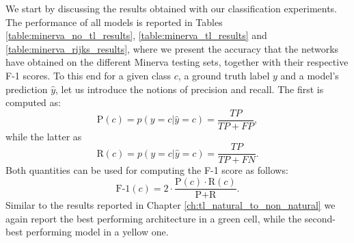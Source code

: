 We start by discussing the results obtained with our classification experiments. The performance of all models is reported in Tables \ref{table:minerva_no_tl_results}, \ref{table:minerva_tl_results} and \ref{table:minerva_rijks_results}, where we present the accuracy that the networks have obtained on the different Minerva testing sets, together with their respective F-1 scores. To this end for a given class $c$, a ground truth label $y$ and a model's prediction $\hat{y}$, let us introduce the notions of precision and recall. The first is computed as:
\begin{equation}
	\text{P}(c)=p(y=c|\hat{y}=c)=\frac{TP}{TP+FP},
\end{equation}
while the latter as
\begin{equation}
	\text{R}(c)=p(y=c|\hat{y}=c)=\frac{TP}{TP+FN}.
\end{equation}
Both quantities can be used for computing the F-1 score as follows:
\begin{equation}
	\text{F-1}(c)=2 \cdot \frac{\text{P}(c)\cdot\text{R}(c)}{\text{P}+\text{R}}.
\end{equation}
Similar to the results reported in Chapter \ref{ch:tl_natural_to_non_natural} we again report the best performing architecture in a green cell, while the second-best performing model in a yellow one.  

